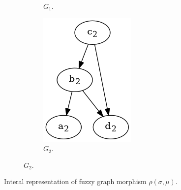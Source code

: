 \begin{frame}
\begin{figure}[htbp]
\begin{subfigure}[t]{0.18\textwidth}
\begin{subfigure}[t]{\textwidth}
				\caption{$G_1$.}
			\end{subfigure}
			\begin{subfigure}[t]{0.8\textwidth}
				\centering
				\includegraphics[width=\linewidth,valign=t]{inc/fuzzy_graph_theory/fuzzy_graph_morphism_G2.png}
				\caption{$G_2$.}
			\end{subfigure}
		\end{subfigure}
		\caption{Interal representation of fuzzy graph morphism $\rho(\sigma, \mu)$.}
	\end{figure}
\end{frame}

